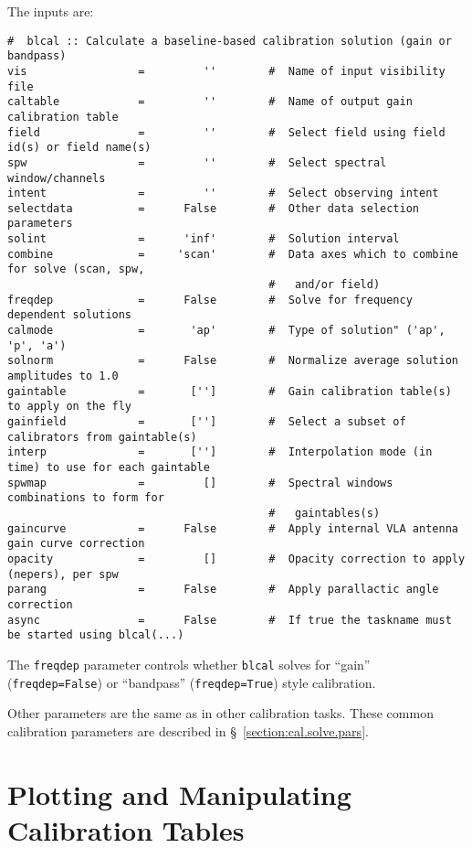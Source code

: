The inputs are:
\small
\begin{verbatim}
#  blcal :: Calculate a baseline-based calibration solution (gain or bandpass)
vis                 =         ''        #  Name of input visibility file
caltable            =         ''        #  Name of output gain calibration table
field               =         ''        #  Select field using field id(s) or field name(s)
spw                 =         ''        #  Select spectral window/channels
intent              =         ''        #  Select observing intent
selectdata          =      False        #  Other data selection parameters
solint              =      'inf'        #  Solution interval
combine             =     'scan'        #  Data axes which to combine for solve (scan, spw,
                                        #   and/or field)
freqdep             =      False        #  Solve for frequency dependent solutions
calmode             =       'ap'        #  Type of solution" ('ap', 'p', 'a')
solnorm             =      False        #  Normalize average solution amplitudes to 1.0
gaintable           =       ['']        #  Gain calibration table(s) to apply on the fly
gainfield           =       ['']        #  Select a subset of calibrators from gaintable(s)
interp              =       ['']        #  Interpolation mode (in time) to use for each gaintable
spwmap              =         []        #  Spectral windows combinations to form for
                                        #   gaintables(s)
gaincurve           =      False        #  Apply internal VLA antenna gain curve correction
opacity             =         []        #  Opacity correction to apply (nepers), per spw
parang              =      False        #  Apply parallactic angle correction
async               =      False        #  If true the taskname must be started using blcal(...)

\end{verbatim}
\normalsize

The {\tt freqdep} parameter controls whether {\tt blcal} solves for 
``gain'' ({\tt freqdep=False}) or ``bandpass'' ({\tt freqdep=True})
style calibration.

Other parameters are the same as in other calibration tasks.
These common calibration parameters are described in
\S~\ref{section:cal.solve.pars}.

\section{Plotting and Manipulating Calibration Tables}
\label{section:cal.tables}


